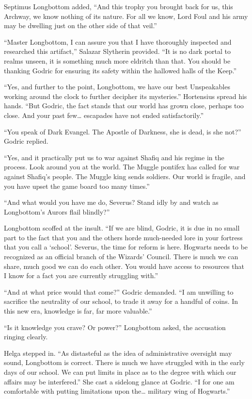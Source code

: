 Septimus Longbottom added, “And this trophy you brought back for us, this Archway, we know nothing of its nature. For all we know, Lord Foul and his army may be dwelling just on the other side of that veil.”

“Master Longbottom, I can assure you that I have thoroughly inspected and researched this artifact,” Salazar Slytherin provided. “It is no dark portal to realms unseen, it is something much more eldritch than that. You should be thanking Godric for ensuring its safety within the hallowed halls of the Keep.”

“Yes, and further to the point, Longbottom, we have our best Unspeakables working around the clock to further decipher its mysteries.” Hortensius spread his hands. “But Godric, the fact stands that our world has grown close, perhaps too close. And your past few… escapades have not ended satisfactorily.”

“You speak of Dark Evangel. The Apostle of Darkness, she is dead, is she not?” Godric replied.

“Yes, and it practically put us to war against Shafiq and his regime in the process. Look around you at the world. The Muggle pontifex has called for war against Shafiq’s people. The Muggle king sends soldiers. Our world is fragile, and you have upset the game board too many times.”

“And what would you have me do, Severus? Stand idly by and watch as Longbottom’s Aurors flail blindly?”

Longbottom scoffed at the insult. “If we are blind, Godric, it is due in no small part to the fact that you and the others horde much-needed lore in your fortress that you call a ‘school’. Severus, the time for reform is here. Hogwarts needs to be recognized as an official branch of the Wizards’ Council. There is much we can share, much good we can do each other. You would have access to resources that I know for a fact you are currently struggling with.”

“And at what price would that come?” Godric demanded. “I am unwilling to sacrifice the neutrality of our school, to trade it away for a handful of coins. In this new era, knowledge is far, far more valuable.”

“Is it knowledge you crave? Or power?” Longbottom asked, the accusation ringing clearly.

Helga stepped in. “As distasteful as the idea of administrative oversight may sound, Longbottom is correct. There is much we have struggled with in the early days of our school. We can put limits in place as to the degree with which our affairs may be interfered.” She cast a sidelong glance at Godric. “I for one am comfortable with putting limitations upon the… military wing of Hogwarts.”

